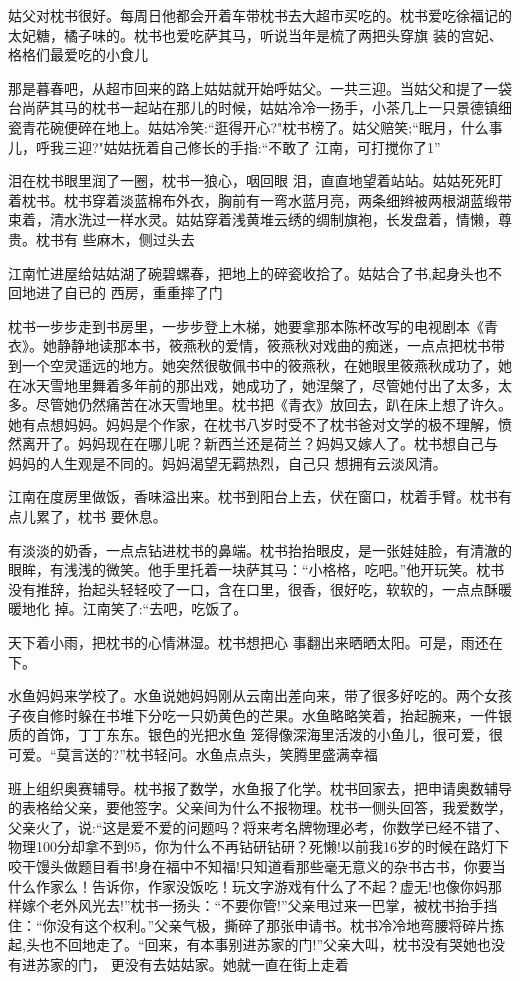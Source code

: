 \documentclass{article}
\begin{document}
姑父对枕书很好。每周日他都会开着车带枕书去大超市买吃的。枕书爱吃徐福记的太妃糖，橘子味的。枕书也爱吃萨其马，听说当年是梳了两把头穿旗
装的宫妃、格格们最爱吃的小食儿 

那是暮春吧，从超市回来的路上姑姑就开始呼姑父。一共三迎。当姑父和提了一袋台尚萨其马的枕书一起站在那儿的时候，姑姑冷冷一扬手，小茶几上一只景德镇细瓷青花碗便碎在地上。姑姑冷笑:“逛得开心?"枕书榜了。姑父赔笑;“眠月，什么事儿，呼我三迎?"姑姑抚着自己修长的手指:“不敢了
江南，可打搅你了1” 

泪在枕书眼里润了一圈，枕书一狼心，咽回眼
\newpage
泪，直直地望着站站。姑姑死死盯着枕书。枕书穿着淡蓝棉布外衣，胸前有一弯水蓝月亮，两条细辫被两根湖蓝缎带束着，清水洗过一样水灵。姑姑穿着浅黄堆云绣的绸制旗袍，长发盘着，情懒，尊贵。枕书有
些麻木，侧过头去 

江南忙进屋给姑姑湖了碗碧螺春，把地上的碎瓷收拾了。姑姑合了书,起身头也不回地进了自已的
西房，重重摔了门 

枕书一步步走到书房里，一步步登上木梯，她要拿那本陈杯改写的电视剧本《青衣》。她静静地读那本书，筱燕秋的爱情，筱燕秋对戏曲的痴迷，一点点把枕书带到一个空灵遥远的地方。她突然很敬佩书中的筱燕秋，在她眼里筱燕秋成功了，她在冰天雪地里舞着多年前的那出戏，她成功了，她涅槃了，尽管她付出了太多，太多。尽管她仍然痛苦在冰天雪地里。枕书把《青衣》放回去，趴在床上想了许久。她有点想妈妈。妈妈是个作家，在枕书八岁时受不了枕书爸对文学的极不理解，愤然离开了。妈妈现在在哪儿呢？新西兰还是荷兰？妈妈又嫁人了。枕书想自己与
\newpage
妈妈的人生观是不同的。妈妈渴望无羁热烈，自己只
想拥有云淡风清。 

江南在度房里做饭，香味溢出来。枕书到阳台上去，伏在窗口，枕着手臂。枕书有点儿累了，枕书
要休息。 

有淡淡的奶香，一点点钻进枕书的鼻端。枕书抬抬眼皮，是一张娃娃脸，有清澈的眼眸，有浅浅的微笑。他手里托着一块萨其马：“小格格，吃吧。”他开玩笑。枕书没有推辞，抬起头轻轻咬了一口，含在口里，很香，很好吃，软软的，一点点酥暖暖地化
掉。江南笑了:“去吧，吃饭了。 

天下着小雨，把枕书的心情淋湿。枕书想把心
事翻出来晒晒太阳。可是，雨还在下。 

水鱼妈妈来学校了。水鱼说她妈妈刚从云南出差向来，带了很多好吃的。两个女孩子夜自修时躲在书堆下分吃一只奶黄色的芒果。水鱼略略笑着，抬起腕来，一件银质的首饰，丁丁东东。银色的光把水鱼
\newpage
笼得像深海里活泼的小鱼儿，很可爱，很可爱。“莫言送的?”枕书轻问。水鱼点点头，笑腾里盛满幸福

班上组织奥赛辅导。枕书报了数学，水鱼报了化学。枕书回家去，把申请奥数辅导的表格给父亲，要他签字。父亲间为什么不报物理。枕书一侧头回答，我爱数学，父亲火了，说:“这是爱不爱的问题吗？将来考名牌物理必考，你数学已经不错了、物理100分却拿不到95，你为什么不再钻研钻研？死懒!以前我16岁的时候在路灯下咬干馒头做题目看书!身在福中不知福!只知道看那些毫无意义的杂书古书，你要当什么作家么！告诉你，作家没饭吃！玩文字游戏有什么了不起？虚无!也像你妈那样嫁个老外风光去!”枕书一扬头：“不要你管!”父亲甩过来一巴掌，被枕书抬手挡住：“你没有这个权利。”父亲气极，撕碎了那张申请书。枕书冷冷地弯腰将碎片拣起,头也不回地走了。“回来，有本事别进苏家的门!”父亲大叫，枕书没有哭她也没有进苏家的门，
更没有去姑姑家。她就一直在街上走着 
\end{document}
